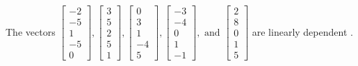 \begin{exercise}
\begin{exerciseStatement}
  \end{exerciseStatement}
  \begin{exerciseAnswer}
   The vectors \(\left[\begin{array}{r}
-2 \\
-5 \\
1 \\
-5 \\
0
\end{array}\right] , \left[\begin{array}{r}
3 \\
5 \\
2 \\
5 \\
1
\end{array}\right] , \left[\begin{array}{r}
0 \\
3 \\
1 \\
-4 \\
5
\end{array}\right] , \left[\begin{array}{r}
-3 \\
-4 \\
0 \\
1 \\
-1
\end{array}\right] , \text{ and } \left[\begin{array}{r}
2 \\
8 \\
0 \\
1 \\
5
\end{array}\right]\) are 
  	 linearly dependent  .
  


  \end{exerciseAnswer}
\end{exercise}